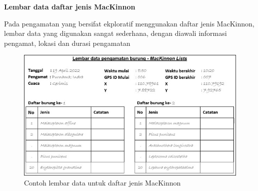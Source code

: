\documentclass[
]{book}
\begin{document}
\textbf{Lembar data daftar jenis MacKinnon}

Pada pengamatan yang bersifat ekploratif menggunakan daftar jenis MacKinnon, lembar data yang digunakan sangat sederhana, dengan diawali informasi pengamat, lokasi dan durasi pengamatan

\begin{figure}

{\centering \includegraphics[width=0.75\linewidth]{images/ldp_ml} 

}

\caption{Contoh lembar data untuk daftar jenis MacKinnon}\label{fig:ldpml}
\end{figure}
\end{document}
